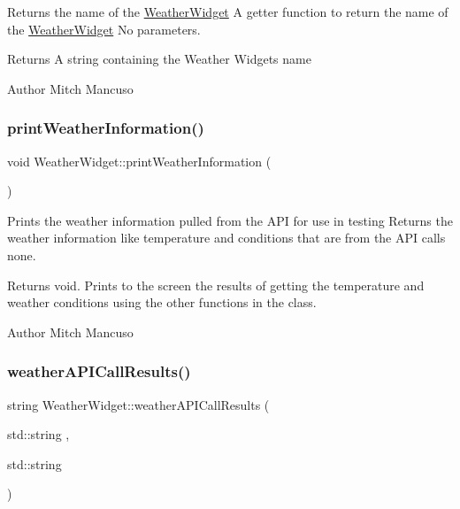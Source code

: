 Returns the name of the \mbox{\hyperlink{class_weather_widget}{Weather\+Widget}}  A getter function to return the name of the \mbox{\hyperlink{class_weather_widget}{Weather\+Widget}}  No parameters. 

\begin{DoxyReturn}{Returns}
A string containing the Weather Widget\textquotesingle{}s name 
\end{DoxyReturn}
\begin{DoxyAuthor}{Author}
Mitch Mancuso 
\end{DoxyAuthor}
\mbox{\label{class_weather_widget_acf4d5ed2d0e64b6a05351883e605ec23}} 
\subsubsection{\texorpdfstring{print\+Weather\+Information()}{printWeatherInformation()}}
{\footnotesize\ttfamily void Weather\+Widget\+::print\+Weather\+Information (\begin{DoxyParamCaption}{ }\end{DoxyParamCaption})}



Prints the weather information pulled from the A\+PI for use in testing  Returns the weather information like temperature and conditions that are from the A\+PI calls  none. 

\begin{DoxyReturn}{Returns}
void. Prints to the screen the results of getting the temperature and weather conditions using the other functions in the class. 
\end{DoxyReturn}
\begin{DoxyAuthor}{Author}
Mitch Mancuso 
\end{DoxyAuthor}
\mbox{\label{class_weather_widget_a1d7fc69f16f114b5bcc82b09dbb359cf}} 
\subsubsection{\texorpdfstring{weather\+A\+P\+I\+Call\+Results()}{weatherAPICallResults()}}
{\footnotesize\ttfamily string Weather\+Widget\+::weather\+A\+P\+I\+Call\+Results (\begin{DoxyParamCaption}\item[{std\+::string}]{,  }\item[{std\+::string}]{ }\end{DoxyParamCaption})}



